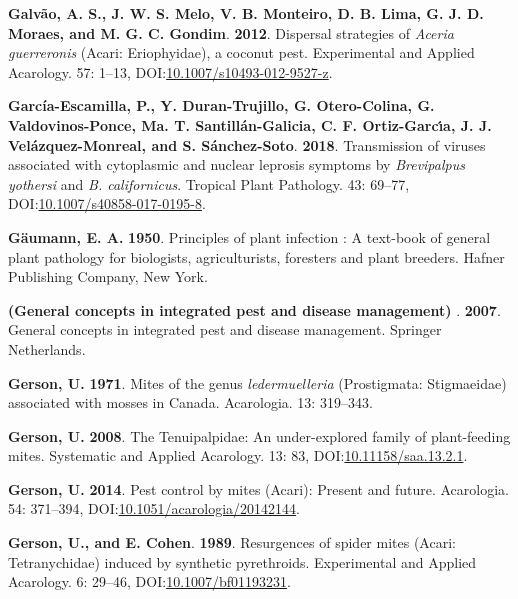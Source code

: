 \documentclass[12pt,final,CPage]{ufthesis}
\newlength{\cslhangindent}
\newenvironment{CSLReferences}[2] %
{%
	\setlength{\parindent}{0pt}
	\ifodd #1 \everypar{\setlength{\hangindent}{\cslhangindent}}\ignorespaces\fi
	\ifnum #2 > 0
	\setlength{\parskip}{#2\baselineskip}
	\fi
}%
{}
\begin{document}
{\begin{CSLReferences}{1}{0}
  \leavevmode{}%
  \textbf{Galvão, A. S., J. W. S. Melo, V. B. Monteiro, D. B. Lima, G. J. D. Moraes, and M. G. C. Gondim}. \textbf{2012}. Dispersal strategies of {\emph{Aceria guerreronis}} ({Acari}: {Eriophyidae}), a coconut pest. Experimental and Applied Acarology. 57: 1--13, DOI:\href{https://doi.org/10.1007/s10493-012-9527-z}{10.1007/s10493-012-9527-z}.

  \leavevmode{}%
  \textbf{García-Escamilla, P., Y. Duran-Trujillo, G. Otero-Colina, G. Valdovinos-Ponce, Ma. T. Santillán-Galicia, C. F. Ortiz-Garcı́a, J. J. Velázquez-Monreal, and S. Sánchez-Soto}. \textbf{2018}. Transmission of viruses associated with cytoplasmic and nuclear leprosis symptoms by {\emph{Brevipalpus yothersi}} and {\emph{B. californicus}}. Tropical Plant Pathology. 43: 69--77, DOI:\href{https://doi.org/10.1007/s40858-017-0195-8}{10.1007/s40858-017-0195-8}.

  \leavevmode{}%
  \textbf{Gäumann, E. A.} \textbf{1950}. Principles of plant infection : A text-book of general plant pathology for biologists, agriculturists, foresters and plant breeders. Hafner Publishing Company, New York.

  \leavevmode{}%
  \textbf{(General concepts in integrated pest and disease management) }. \textbf{2007}. General concepts in integrated pest and disease management. Springer Netherlands.

  \leavevmode{}%
  \textbf{Gerson, U.} \textbf{1971}. Mites of the genus \emph{ledermuelleria} ({Prostigmata}: {Stigmaeidae}) associated with mosses in {Canada}. Acarologia. 13: 319--343.

  \leavevmode{}%
  \textbf{Gerson, U.} \textbf{2008}. The {Tenuipalpidae}: An under-explored family of plant-feeding mites. Systematic and Applied Acarology. 13: 83, DOI:\href{https://doi.org/10.11158/saa.13.2.1}{10.11158/saa.13.2.1}.

  \leavevmode{}%
  \textbf{Gerson, U.} \textbf{2014}. Pest control by mites ({Acari}): Present and future. Acarologia. 54: 371--394, DOI:\href{https://doi.org/10.1051/acarologia/20142144}{10.1051/acarologia/20142144}.

  \leavevmode{}%
  \textbf{Gerson, U., and E. Cohen}. \textbf{1989}. Resurgences of spider mites ({Acari}: {Tetranychidae}) induced by synthetic pyrethroids. Experimental and Applied Acarology. 6: 29--46, DOI:\href{https://doi.org/10.1007/bf01193231}{10.1007/bf01193231}.


\end{CSLReferences}}
\end{document}
